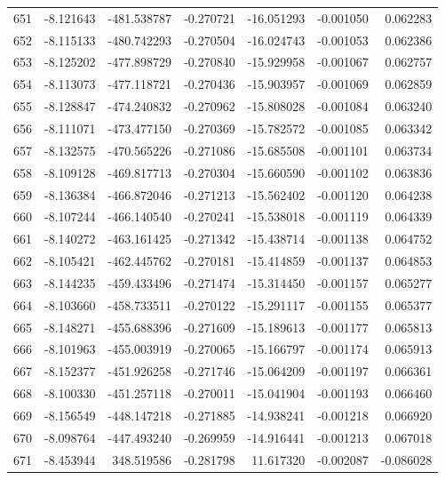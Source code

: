 \begin{tabular}{rrrrrrr}
 651 &  -8.121643 & -481.538787 & -0.270721 & -16.051293 &  -0.001050 &  0.062283 \\
 652 &  -8.115133 & -480.742293 & -0.270504 & -16.024743 &  -0.001053 &  0.062386 \\
 653 &  -8.125202 & -477.898729 & -0.270840 & -15.929958 &  -0.001067 &  0.062757 \\
 654 &  -8.113073 & -477.118721 & -0.270436 & -15.903957 &  -0.001069 &  0.062859 \\
 655 &  -8.128847 & -474.240832 & -0.270962 & -15.808028 &  -0.001084 &  0.063240 \\
 656 &  -8.111071 & -473.477150 & -0.270369 & -15.782572 &  -0.001085 &  0.063342 \\
 657 &  -8.132575 & -470.565226 & -0.271086 & -15.685508 &  -0.001101 &  0.063734 \\
 658 &  -8.109128 & -469.817713 & -0.270304 & -15.660590 &  -0.001102 &  0.063836 \\
 659 &  -8.136384 & -466.872046 & -0.271213 & -15.562402 &  -0.001120 &  0.064238 \\
 660 &  -8.107244 & -466.140540 & -0.270241 & -15.538018 &  -0.001119 &  0.064339 \\
 661 &  -8.140272 & -463.161425 & -0.271342 & -15.438714 &  -0.001138 &  0.064752 \\
 662 &  -8.105421 & -462.445762 & -0.270181 & -15.414859 &  -0.001137 &  0.064853 \\
 663 &  -8.144235 & -459.433496 & -0.271474 & -15.314450 &  -0.001157 &  0.065277 \\
 664 &  -8.103660 & -458.733511 & -0.270122 & -15.291117 &  -0.001155 &  0.065377 \\
 665 &  -8.148271 & -455.688396 & -0.271609 & -15.189613 &  -0.001177 &  0.065813 \\
 666 &  -8.101963 & -455.003919 & -0.270065 & -15.166797 &  -0.001174 &  0.065913 \\
 667 &  -8.152377 & -451.926258 & -0.271746 & -15.064209 &  -0.001197 &  0.066361 \\
 668 &  -8.100330 & -451.257118 & -0.270011 & -15.041904 &  -0.001193 &  0.066460 \\
 669 &  -8.156549 & -448.147218 & -0.271885 & -14.938241 &  -0.001218 &  0.066920 \\
 670 &  -8.098764 & -447.493240 & -0.269959 & -14.916441 &  -0.001213 &  0.067018 \\
 671 &  -8.453944 &  348.519586 & -0.281798 &  11.617320 &  -0.002087 & -0.086028 \\

\end{tabular}

